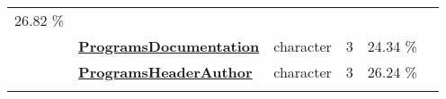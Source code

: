 \documentclass[]{article}
\begin{document}
\begin{longtable}[]{@{}lllrcl@{}}
\begin{minipage}[t]{0.10\columnwidth}
26.82 \%\strut
\end{minipage} & \begin{minipage}[t]{0.12\columnwidth}\raggedright\strut
\strut
\end{minipage}\tabularnewline
\begin{minipage}[t]{0.07\columnwidth}\raggedright\strut
\strut
\end{minipage} & \begin{minipage}[t]{0.35\columnwidth}\raggedright\strut
\textbf{\protect\hyperlink{programsdocumentation}{ProgramsDocumentation}}\strut
\end{minipage} & \begin{minipage}[t]{0.11\columnwidth}\raggedright\strut
character\strut
\end{minipage} & \begin{minipage}[t]{0.10\columnwidth}\raggedleft\strut
3\strut
\end{minipage} & \begin{minipage}[t]{0.10\columnwidth}\centering\strut
24.34 \%\strut
\end{minipage} & \begin{minipage}[t]{0.12\columnwidth}\raggedright\strut
\strut
\end{minipage}\tabularnewline
\begin{minipage}[t]{0.07\columnwidth}\raggedright\strut
\strut
\end{minipage} & \begin{minipage}[t]{0.35\columnwidth}\raggedright\strut
\textbf{\protect\hyperlink{programsheaderauthor}{ProgramsHeaderAuthor}}\strut
\end{minipage} & \begin{minipage}[t]{0.11\columnwidth}\raggedright\strut
character\strut
\end{minipage} & \begin{minipage}[t]{0.10\columnwidth}\raggedleft\strut
3\strut
\end{minipage} & \begin{minipage}[t]{0.10\columnwidth}\centering\strut
26.24 \%\strut
\end{minipage} & \begin{minipage}[t]{0.12\columnwidth}\raggedright\strut
\strut
\end{minipage}\tabularnewline
\begin{minipage}[t]{0.07\columnwidth}\raggedright\strut
\strut
\end{minipage} & \begin{minipage}[t]{0.35\columnwidth}\raggedright\strut

\end{minipage}
\end{longtable}
\end{document}
